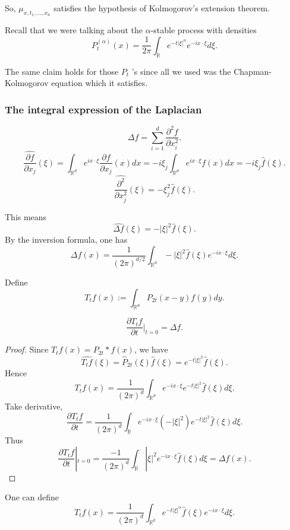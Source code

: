 So, $\mu_{x, t_1, \ldots, x_n}$ satisfies the hypothesis of Kolmogorov's extension theorem.

Recall that we were talking about the $\alpha$-stable process with densities
\[
	P_t^{(\alpha)}(x) = \frac{1}{2 \pi} \int _{\mathbb{R}} e^{- t |\xi|^\alpha} e^{ - i x \cdot  \xi} d \xi
.\] 

The same claim holds for those $P_t$ 's since all we used was the Chapman-Kolmogorov equation which it satisfies.

\subsubsection{The integral expression of the Laplacian}

\[
	\Delta f = \sum_{i=1}^{d} \frac{\partial ^2 f}{\partial x_i^2} 
.\] 
\[
	\widehat{\frac{\partial f}{\partial x_j} }(\xi) = 
	\int _{\mathbb{R}^d} e^{i x \cdot  \xi} \frac{\partial f}{\partial x_j} (x) dx =
	- i \xi_j \int _{\mathbb{R}^d} e^{ i x \cdot  \xi} f(x) d x =
	- i \xi_j \hat{f} (\xi)
.\] 
\[
	\widehat {\frac{\partial ^2}{\partial x_j^2} }(\xi) = - \xi_j^2 \hat{f} (\xi)
.\] 

This means
\[
	\widehat{\Delta f}(\xi) = - |\xi|^2 \hat{f} (\xi)
.\] 
By the inversion formula, one has
\[
	\Delta f(x) = \frac{1}{\left( 2 \pi \right) ^{d / 2}} \int _{\mathbb{R}^d} - |\xi|^2 \hat{f} (\xi) e^{- i x \cdot  \xi} d \xi
.\] 

Define
\[
	T_t f(x) := \int _{\mathbb{R}^d} P_{2 t}(x - y) f(y) dy
.\] 

\begin{claim}
	\[
		\frac{\partial T_t f}{\partial t} |_{t = 0} = \Delta f
	.\] 
\end{claim}
\begin{proof}
	Since $T_t f(x) = P_{2t} * f (x)$, we have
	\[
		\widehat{T_t f} (\xi) = \hat{P} _{2 t}(\xi) \hat{f} (\xi)
		= e^{ - t |\xi|^2} \hat{f} (\xi)
	.\] 
	Hence
	\[
		T_t f(x) = \frac{1}{\left( 2 \pi \right) ^d} \int _{\mathbb{R}^d} e^{- i x \cdot  \xi} e^{ - t |\xi|^2} \hat{f} (\xi) d \xi
	.\] 
	Take derivative,
	\[
		\frac{\partial T_t f}{\partial t} = \frac{1}{( 2 \pi)^d} \int _{\mathbb{R}} e^{- i x \cdot  \xi} \left( - |\xi|^2 \right)  e^{ - t |\xi|^2} \hat{f} (\xi) d \xi
	.\] 
	Thus
\[
		\frac{\partial T_t f}{\partial t}|_{t = 0} = 
		\frac{-1}{( 2 \pi)^d} \int _{\mathbb{R}} |\xi|^2  e^{- i x \cdot  \xi} \hat{f} (\xi) d \xi = \Delta f(x)
	.\]
\end{proof}

One can define
\[
	T_t f(x) = \frac{1}{(2 \pi)^d} \int _{\mathbb{R}^d} e^{- t |\xi|^\alpha} \hat{f} (\xi) e^{- i x \cdot  \xi} d \xi
.\] 

